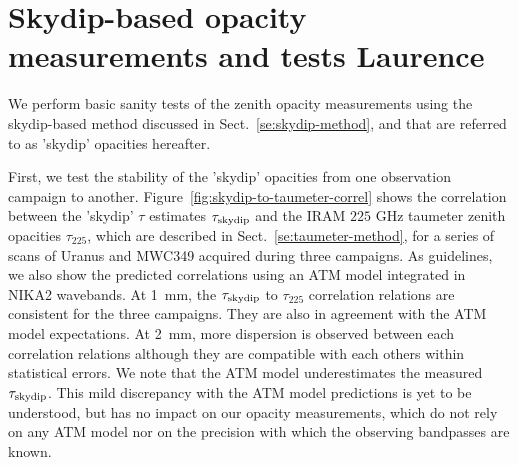 \section{Skydip-based opacity measurements and tests {\color{YellowGreen} Laurence}}
\label{se:skydip-opacity_tests}

We perform basic sanity tests of the zenith opacity measurements using
the skydip-based method discussed in Sect.~\ref{se:skydip-method}, and
that are referred to as 'skydip' opacities hereafter.

First, we test the stability of the 'skydip' opacities from one
observation campaign to another.
Figure~\ref{fig:skydip-to-taumeter-correl} shows the
correlation between the 'skydip' $\tau$ estimates $\tau_{\rm{skydip}}$
and the IRAM $225$ GHz taumeter zenith opacities $\tau_{225}$, which
are described in Sect.~\ref{se:taumeter-method}, for a series of scans
of Uranus and MWC349 acquired during three campaigns. As guidelines,
we also show the predicted correlations using an ATM model integrated
in NIKA2 wavebands. At 1~mm, the
$\tau_{\rm{skydip}}$ to $\tau_{225}$ correlation relations are
consistent for the three campaigns. They are
also in agreement with the ATM model expectations. At 2~mm, more
dispersion is observed between each correlation relations although
they are compatible with each others within statistical errors.
We note that the ATM model underestimates the
measured $\tau_{\rm{skydip}}$. This mild discrepancy with the
ATM model predictions is yet to be understood, but has no impact on
our opacity measurements, which do not rely on any ATM model nor on
the precision with which the observing bandpasses are known.


